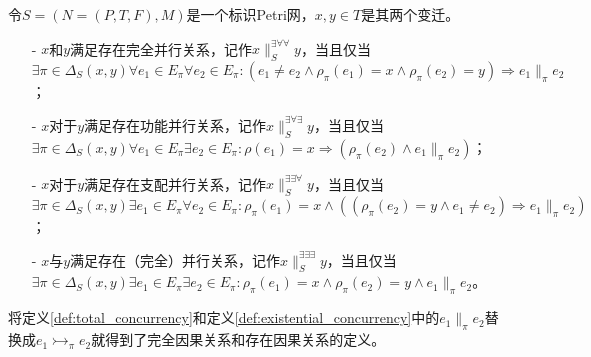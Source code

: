 \begin{definition}[存在并行]\label{def:existential_concurrency}
令$S=(N=(P,T,F),M)$是一个标识Petri网，$x,y\in T$是其两个变迁。
  \begin{itemize}[leftmargin=22pt]
    \item[-] $x$和$y$满足存在完全并行关系，记作$x\parallel_{S}^{\exists\forall\forall}y$，当且仅当\\
    $
      \exists\pi\in\Delta_{S}(x,y)\forall e_{1}\in E_{\pi}\forall e_{2}\in E_{\pi}:(e_{1}\neq e_{2}\wedge\rho_{\pi}(e_{1})=x\wedge\rho_{\pi}(e_{2})=y)\Rightarrow e_{1}\parallel_{\pi}e_{2}
    $；
    \item[-] $x$对于$y$满足存在功能并行关系，记作$x\parallel_{S}^{\exists\forall\exists}y$，当且仅当\\
    $
      \exists\pi\in\Delta_{S}(x,y)\forall e_{1}\in E_{\pi}\exists e_{2}\in E_{\pi}:\rho(e_{1})=x\Rightarrow(\rho_{\pi}(e_{2})\wedge e_{1}\parallel_{\pi}e_{2})
    $；
    \item[-] $x$对于$y$满足存在支配并行关系，记作$x\parallel_{S}^{\exists\exists\forall}y$，当且仅当\\
    $
      \exists\pi\in\Delta_{S}(x,y)\exists e_{1}\in E_{\pi}\forall e_{2}\in E_{\pi}:\rho_{\pi}(e_{1})=x\wedge((\rho_{\pi}(e_{2})=y\wedge e_{1}\neq e_{2})\Rightarrow e_{1}\parallel_{\pi}e_{2})
    $；
    \item[-] $x$与$y$满足存在（完全）并行关系，记作$x\parallel_{S}^{\exists\exists\exists}y$，当且仅当\\
    $
      \exists\pi\in\Delta_{S}(x,y)\exists e_{1}\in E_{\pi}\exists e_{2}\in E_{\pi}:\rho_{\pi}(e_{1})=x\wedge\rho_{\pi}(e_{2})=y\wedge e_{1}\parallel_{\pi}e_{2}
    $。
  \end{itemize}
\end{definition}
将定义\ref{def:total_concurrency}和定义\ref{def:existential_concurrency}中的$e_{1}\parallel_{\pi}e_{2}$替换成$e_{1}\rightarrowtail_{\pi}e_{2}$就得到了完全因果关系和存在因果关系的定义。

